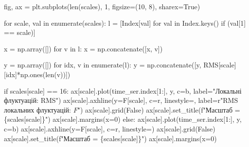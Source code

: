 \documentclass[
  letterpaper,
]{report}
\newenvironment{Shaded}{\begin{snugshade}}{\end{snugshade}}
\newcommand{\BuiltInTok}[1]{\textcolor[rgb]{0.00,0.23,0.31}{#1}}
\newcommand{\ControlFlowTok}[1]{\textcolor[rgb]{0.00,0.23,0.31}{#1}}
\newcommand{\DecValTok}[1]{\textcolor[rgb]{0.68,0.00,0.00}{#1}}
\newcommand{\KeywordTok}[1]{\textcolor[rgb]{0.00,0.23,0.31}{#1}}
\newcommand{\NormalTok}[1]{\textcolor[rgb]{0.00,0.23,0.31}{#1}}
\newcommand{\OperatorTok}[1]{\textcolor[rgb]{0.37,0.37,0.37}{#1}}
\newcommand{\SpecialCharTok}[1]{\textcolor[rgb]{0.37,0.37,0.37}{#1}}
\newcommand{\SpecialStringTok}[1]{\textcolor[rgb]{0.13,0.47,0.30}{#1}}
\newcommand{\StringTok}[1]{\textcolor[rgb]{0.13,0.47,0.30}{#1}}
\newcommand{\VariableTok}[1]{\textcolor[rgb]{0.07,0.07,0.07}{#1}}
\newcommand{\VerbatimStringTok}[1]{\textcolor[rgb]{0.13,0.47,0.30}{#1}}
\begin{document}
\begin{Shaded}
\begin{Highlighting}[]
\NormalTok{fig, ax }\OperatorTok{=}\NormalTok{ plt.subplots(}\BuiltInTok{len}\NormalTok{(scales), }\DecValTok{1}\NormalTok{, figsize}\OperatorTok{=}\NormalTok{(}\DecValTok{10}\NormalTok{, }\DecValTok{8}\NormalTok{), sharex}\OperatorTok{=}\VariableTok{True}\NormalTok{)}

\ControlFlowTok{for}\NormalTok{ scale, val }\KeywordTok{in} \BuiltInTok{enumerate}\NormalTok{(scales):}
\NormalTok{    l }\OperatorTok{=}\NormalTok{ [Index[val] }\ControlFlowTok{for}\NormalTok{ val }\KeywordTok{in}\NormalTok{ Index.keys() }\ControlFlowTok{if}\NormalTok{ (val[}\DecValTok{1}\NormalTok{] }\OperatorTok{==}\NormalTok{ scale)]}

\NormalTok{    x }\OperatorTok{=}\NormalTok{ np.array([])}
    \ControlFlowTok{for}\NormalTok{ v }\KeywordTok{in}\NormalTok{ l:}
\NormalTok{        x }\OperatorTok{=}\NormalTok{ np.concatenate([x, v])}

\NormalTok{    y }\OperatorTok{=}\NormalTok{ np.array([])}
    \ControlFlowTok{for}\NormalTok{ idx, v }\KeywordTok{in} \BuiltInTok{enumerate}\NormalTok{(l): }
\NormalTok{        y }\OperatorTok{=}\NormalTok{ np.concatenate([y, RMS[scale][idx]}\OperatorTok{*}\NormalTok{np.ones(}\BuiltInTok{len}\NormalTok{(v))])}

    \ControlFlowTok{if}\NormalTok{ scales[scale] }\OperatorTok{==} \DecValTok{16}\NormalTok{:}
\NormalTok{        ax[scale].plot(time\_ser.index[}\DecValTok{1}\NormalTok{:], y, c}\OperatorTok{=}\StringTok{\textquotesingle{}b\textquotesingle{}}\NormalTok{, label}\OperatorTok{=}\StringTok{"Локальні флуктуацій: RMS"}\NormalTok{)}
\NormalTok{        ax[scale].axhline(y}\OperatorTok{=}\NormalTok{F[scale], c}\OperatorTok{=}\StringTok{\textquotesingle{}r\textquotesingle{}}\NormalTok{, linestyle}\OperatorTok{=}\StringTok{\textquotesingle{}{-}\textquotesingle{}}\NormalTok{, label}\OperatorTok{=}\VerbatimStringTok{r"RMS локальних флуктуацій: $F$"}\NormalTok{)}
\NormalTok{        ax[scale].grid(}\VariableTok{False}\NormalTok{)}
\NormalTok{        ax[scale].set\_title(}\SpecialStringTok{f"Масштаб = }\SpecialCharTok{\{}\NormalTok{scales[scale]}\SpecialCharTok{\}}\SpecialStringTok{"}\NormalTok{)}
\NormalTok{        ax[scale].margins(x}\OperatorTok{=}\DecValTok{0}\NormalTok{)}
    \ControlFlowTok{else}\NormalTok{: }
\NormalTok{        ax[scale].plot(time\_ser.index[}\DecValTok{1}\NormalTok{:], y, c}\OperatorTok{=}\StringTok{\textquotesingle{}b\textquotesingle{}}\NormalTok{)}
\NormalTok{        ax[scale].axhline(y}\OperatorTok{=}\NormalTok{F[scale], c}\OperatorTok{=}\StringTok{\textquotesingle{}r\textquotesingle{}}\NormalTok{, linestyle}\OperatorTok{=}\StringTok{\textquotesingle{}{-}\textquotesingle{}}\NormalTok{)}
\NormalTok{        ax[scale].grid(}\VariableTok{False}\NormalTok{)}
\NormalTok{        ax[scale].set\_title(}\SpecialStringTok{f"Масштаб = }\SpecialCharTok{\{}\NormalTok{scales[scale]}\SpecialCharTok{\}}\SpecialStringTok{"}\NormalTok{)}
\NormalTok{        ax[scale].margins(x}\OperatorTok{=}\DecValTok{0}\NormalTok{)       }


\end{Highlighting}
\end{Shaded}
\end{document}
